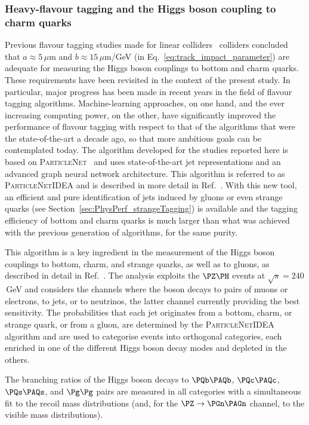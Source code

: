 \subsubsection{Heavy-flavour tagging and the Higgs boson coupling to charm quarks}
\label{sec:PhysPerf_Hcc}

Previous flavour tagging studies made for linear colliders~\cite{Behnke:2013lya,Linssen:2012hp} colliders 
concluded that $a \approx 5$\,$\mu$m and $b \approx 15$\,$\mu$m/GeV 
(in Eq.~\ref{eq:track_impact_parameter}) 
are adequate for measuring the Higgs boson couplings to bottom and charm quarks. 
These requirements have been revisited in the context of the present study. 
In particular, major progress has been made in recent years in the field of flavour tagging algorithms. 
Machine-learning approaches, on one hand, and the ever increasing computing power, on the other, 
have significantly improved the performance of flavour tagging with respect to that of the algorithms that were the state-of-the-art a decade ago, 
so that more ambitious goals can be contemplated today. 
The algorithm developed for the studies reported here is based on {\textsc{ParticleNet}}~\cite{Qu:2019gqs} 
and uses state-of-the-art jet representations and an advanced graph neural network architecture. 
This algorithm is referred to as {\textsc{ParticleNetIDEA}} and is described in more detail in Ref.~\cite{Bedeschi:2022rnj}. 
With this new tool, an efficient and pure identification of jets induced by gluons or even strange quarks (see Section~\ref{sec:PhysPerf_strangeTagging}) 
is available and the tagging efficiency of bottom and charm quarks is much larger than what was achieved with the previous generation of algorithms, 
for the same purity.

This algorithm is a key ingredient in the measurement of the Higgs boson couplings to bottom, charm, and strange quarks, as well as to gluons, 
as described in detail in Ref.~\cite{note_Higgs_to_hadrons}. 
The analysis exploits the $\PZ\PH$ events at $\sqrt{s} = 240$\,GeV and considers the channels where the \PZ boson decays 
to pairs of muons or electrons, to jets, or to neutrinos, the latter channel currently providing the best sensitivity. 
The probabilities that each jet originates from a bottom, charm, or strange quark, or from a gluon, 
are determined by the \textsc{ParticleNetIDEA} algorithm and are used to categorise events into orthogonal categories, 
each enriched in one of the different Higgs boson decay modes and depleted in the others. 

The branching ratios of the Higgs boson decays to $\PQb\PAQb$, $\PQc\PAQc$, $\PQs\PAQs$, and $\Pg\Pg$ pairs
are measured in all categories with a simultaneous fit to the recoil mass distributions 
(and, for the $\PZ \to \PGn \PAGn$ channel, to the visible mass distributions).

